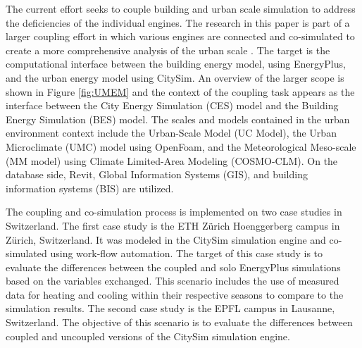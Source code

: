 \documentclass{tBPS2e}
\theoremstyle{plain}
\theoremstyle{definition}
\theoremstyle{remark}
\begin{document}
The current
effort seeks to couple building and urban scale simulation to address the deficiencies of the individual engines. The research in
this paper is part of a larger coupling effort in which various engines are
connected and co-simulated to create a more comprehensive analysis of the
urban scale \citep{dorer_modelling_2013,allegrini_influence_2012}. The target is the
computational interface between the building energy model, using EnergyPlus,
and the urban energy model using CitySim. An overview of the larger scope is
shown in Figure \ref{fig:UMEM} and the context of the coupling task appears as 
the interface between the City Energy Simulation (CES) model and the
Building Energy Simulation (BES) model. The scales and models contained in the 
urban environment context include the Urban-Scale Model (UC Model), the Urban 
Microclimate (UMC) model using OpenFoam, and the Meteorological Meso-scale (MM model) 
using Climate Limited-Area Modeling (COSMO-CLM). On the database side, Revit, Global 
Information Systems (GIS), and building information systems (BIS) are utilized.

The coupling and co-simulation process is implemented on two case studies in
Switzerland. The first case study is the ETH Z\"urich Hoenggerberg campus in
Z\"urich, Switzerland. It was modeled in the CitySim simulation engine
and co-simulated using work-flow automation. The target of this case study is
to evaluate the differences between the coupled and solo EnergyPlus
simulations based on the variables exchanged. This scenario includes the use
of measured data for heating and cooling within their respective seasons to
compare to the simulation results. The second case study is the EPFL campus in
Lausanne, Switzerland. The objective of this scenario is to evaluate the
differences between coupled and uncoupled versions of the CitySim simulation
engine.
\end{document}
